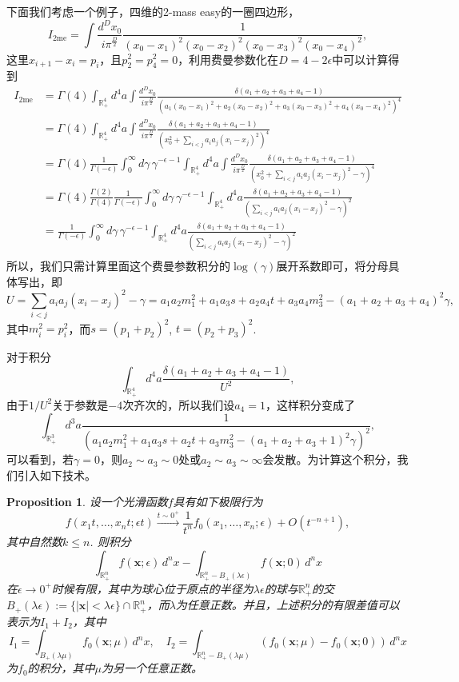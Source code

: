 \documentclass[12pt]{article}
\theoremstyle{definition}
\theoremstyle{plain}
\newtheorem{pro}[para]{Proposition}
\begin{document}
下面我们考虑一个例子，四维的2-mass easy的一圈四边形，
\[
	I_{\text{2me}}=\int \frac{d^{D} x_0}{i \pi^{\frac{D}{2}}} \frac{1}{(x_0-x_1)^2(x_0-x_2)^2(x_0-x_3)^2(x_0-x_4)^2},
\]
这里$x_{i+1}-x_i=p_i$，且$p_2^2=p_4^2=0$，利用费曼参数化在$D=4-2\epsilon$中可以计算得到
\[
\begin{aligned}
	I_{\text{2me}}&=\Gamma(4)\int_{\mathbb R_+^4}d^4a\int \frac{d^{D} x_0}{i \pi^{\frac{D}{2}}} \frac{\delta(a_1+a_2+a_3+a_4-1)}{(a_1(x_0-x_1)^2+a_2(x_0-x_2)^2+a_3(x_0-x_3)^2+a_4(x_0-x_4)^2)^4}\\
	&=\Gamma(4)\int_{\mathbb R_+^4}d^4a\int \frac{d^{D} x_0}{i \pi^{\frac{D}{2}}} \frac{\delta(a_1+a_2+a_3+a_4-1)}{(x_0^2+\sum_{i<j}a_i a_j (x_i-x_j)^2)^4}\\
	&=\Gamma(4)\frac{1}{\Gamma(-\epsilon)}\int_0^\infty d\gamma \, \gamma^{-\epsilon-1}\int_{\mathbb R_+^4}d^4a\int \frac{d^{D} x_0}{i \pi^{\frac{D}{2}}} \frac{\delta(a_1+a_2+a_3+a_4-1)}{(x_0^2+\sum_{i<j}a_i a_j (x_i-x_j)^2-\gamma)^4}\\
	&=\Gamma(4)\frac{\Gamma(2)}{\Gamma(4)}\frac{1}{\Gamma(-\epsilon)}\int_0^\infty d\gamma \, \gamma^{-\epsilon-1}\int_{\mathbb R_+^4}d^4a\frac{\delta(a_1+a_2+a_3+a_4-1)}{(\sum_{i<j}a_i a_j (x_i-x_j)^2-\gamma)^2}\\
	&=\frac{1}{\Gamma(-\epsilon)}\int_0^\infty d\gamma \, \gamma^{-\epsilon-1}\int_{\mathbb R_+^4}d^4a\frac{\delta(a_1+a_2+a_3+a_4-1)}{(\sum_{i<j}a_i a_j (x_i-x_j)^2-\gamma)^2}\\
\end{aligned}
\]
所以，我们只需计算里面这个费曼参数积分的$\log(\gamma)$展开系数即可，将分母具体写出，即
\[
	U=\sum_{i<j}a_i a_j (x_i-x_j)^2-\gamma=a_1a_2 m_1^2+a_1a_3s+a_2a_4t+a_3a_4m_3^2-(a_1+a_2+a_3+a_4)^2\gamma,
\]
其中$m_i^2=p_i^2$，而$s=(p_1+p_2)^2$, $t=(p_2+p_3)^2$.

对于积分 
\[
	\int_{\mathbb R_+^4}d^4a\frac{\delta(a_1+a_2+a_3+a_4-1)}{U^2},
\]
由于$1/U^2$关于参数是$-4$次齐次的，所以我们设$a_4=1$，这样积分变成了
\[
	\int_{\mathbb R_+^3}d^3a\frac{1}{(a_1a_2 m_1^2+a_1a_3s+a_2t+a_3m_3^2-(a_1+a_2+a_3+1)^2\gamma)^2},
\]
可以看到，若$\gamma=0$，则$a_2\sim a_3\sim 0$处或$a_2\sim a_3\sim \infty$会发散。为计算这个积分，我们引入如下技术。



\begin{pro}
设一个光滑函数$f$具有如下极限行为
\[
f(x_1t,\dots,x_nt;\epsilon t)\xrightarrow{t\sim 0^+}\frac{1}{t^n}f_0(x_1,\dots,x_n;\epsilon)+O(t^{-n+1}),
\]
其中自然数$k\leq n$. 则积分
\[
\int_{\mathbb R_+^n} f(\mathbf{x};\epsilon)\,d^nx-\int_{\mathbb R_+^n - B_+(\lambda \epsilon)} f(\mathbf{x};0)\,d^nx
\]
在$\epsilon\to 0^+$时候有限，其中为球心位于原点的半径为$\lambda \epsilon$的球与$\mathbb R_+^n$的交$B_+(\lambda \epsilon):=\{|\mathbf x|<\lambda \epsilon\}\cap \mathbb R_+^n$，而$\lambda$为任意正数。并且，上述积分的有限差值可以表示为$I_1+I_2$，其中
\[
	I_1=\int_{B_+(\lambda\mu)}f_0(\mathbf{x};\mu)\,d^nx,\quad I_2=\int_{\mathbb R_+^n - B_+(\lambda\mu)} (f_0(\mathbf x;\mu)-f_0(\mathbf x;0))\,d^nx
\]
为$f_0$的积分，其中$\mu$为另一个任意正数。
\end{pro}
\end{document}
